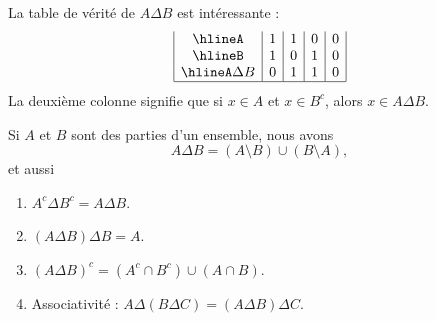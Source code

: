 \begin{remark}\label{REMooTableVeriteDiffSym}
	La table de vérité de \( A\Delta B\) est intéressante :
	\begin{equation}        \label{EQooOJBOooKkKbYp}
		\begin{array}{|c|c|c|c|c|}
			\hline%
			A         & 1 & 1 & 0 & 0 \\
			\hline%
			B         & 1 & 0 & 1 & 0 \\
			\hline%
			A\Delta B & 0 & 1 & 1 & 0 \\
			\hline%
		\end{array}
	\end{equation}
	La deuxième colonne signifie que si \( x\in A\) et \( x\in B^c\), alors \( x\in A\Delta B\).
\end{remark}


\begin{lemma}   \label{LemCUVoohKpWB}
	Si \( A\) et \( B\) sont des parties d'un ensemble, nous avons
	\begin{equation}		\label{EQooMWTNooKXfFvU}
		A\Delta B=(A\setminus B)\cup (B\setminus A),
	\end{equation}
	et aussi
	\begin{enumerate}
		\item       \label{ItemVUCooHAztC}
		      \( A^c\Delta B^c=A\Delta B\).
		\item\label{ItemVUCooHAztCii}
		      \( (A\Delta B)\Delta B=A\).
		\item       \label{ITEMooSPZXooPTgisP}
		      \( (A\Delta B)^c=(A^c\cap B^c)\cup(A\cap B)\).
		\item       \label{ITEMooSMXWooYcWsRC}
		      Associativité : \( A\Delta (B\Delta C)=(A\Delta B)\Delta C\).
	\end{enumerate}
\end{lemma}

